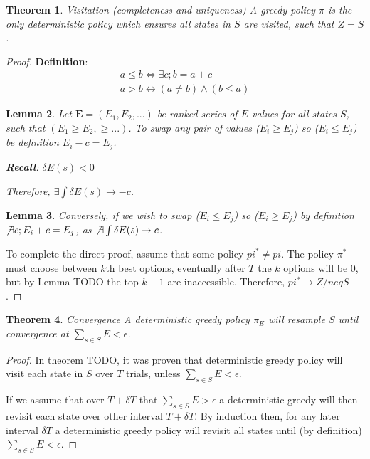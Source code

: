 \documentclass[9pt,twocolumn,twoside]{pnas-new}
\newtheorem{theorem}{Theorem}
\newtheorem{lemma}[theorem]{Lemma}
\begin{document}
\begin{theorem}{Visitation (completeness and uniqueness)}
A greedy policy $\pi$ is the only deterministic policy which ensures all states in $S$ are visited, such that $Z = S$.
\end{theorem}

\begin{proof}
    \textbf{Definition}: 
    \begin{align}
        a \leq b \Leftrightarrow \exists c; b = a + c \\
        a > b \leftrightarrow (a \neq b) \wedge (b \leq a) 
    \end{align}

    \begin{lemma}
    Let $\textbf{E} = (E_1, E_2, ...)$ be ranked series of $E$ values for all states $S$, such that $(E_1 \geq E_2, \geq ...)$. To swap any pair of values ($E_i \geq E_j$) so ($E_i \leq E_j$) be definition $E_i - c = E_j$.  

    \textbf{Recall}: $\delta E(s) < 0$ 

    Therefore, $\exists \int \delta E(s) \rightarrow -c$. 
    \end{lemma}

    \begin{lemma}
    Conversely, if we wish to swap ($E_i \leq E_j$) so ($E_i \geq E_j$) by definition $\not \exists c; E_i + c = E_j$, as $\not \exists \int \delta E(s) \rightarrow c$. 
    \end{lemma}

    To complete the direct proof, assume that some policy $pi^* \neq pi$. The policy $\pi^*$ must choose between $k$th best options, eventually after $T$ the $k$ options will be 0, but by Lemma TODO the top $k-1$ are inaccessible. Therefore, $pi^* \rightarrow Z /neq S$.
\end{proof}

\begin{theorem}{Convergence}
    A deterministic greedy policy $\pi_E$ will resample $S$ until convergence at $\sum_{s \in S} E < \epsilon$.
\end{theorem}
\begin{proof}
    In theorem TODO, it was proven that deterministic greedy policy will visit each state in $S$ over $T$ trials, unless $\sum_{s \in S} E < \epsilon$. 
    
    If we assume that over $T + \delta T$ that $\sum_{s \in S} E > \epsilon$ a deterministic greedy will then revisit each state over other interval $T + \delta T$. By induction then, for any later interval $\delta T$ a deterministic greedy policy will revisit all states until (by definition) $\sum_{s \in S} E < \epsilon$.
\end{proof}
\end{document}
